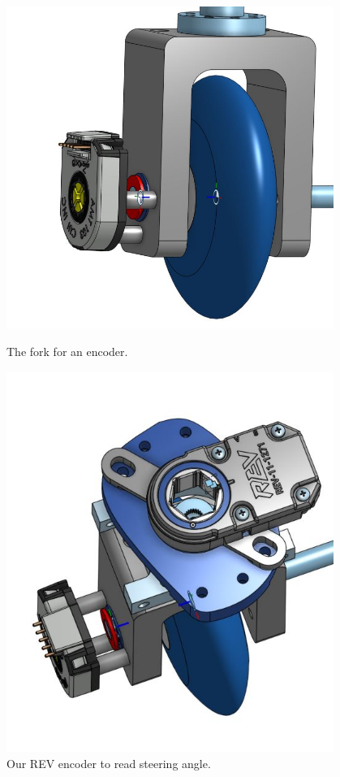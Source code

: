  

\begin{figure}[ht]
\centering
\begin{minipage}[b]{.48\textwidth}
  \centering
  \includegraphics[width=0.95\textwidth]{Meetings/October/10-20-21/10-20-21_CAD_Figure1 - Nathan Forrer.JPG}
  \caption{The fork for an encoder.}
  \label{fig:102021_1}
\end{minipage}%
\hfill%
\begin{minipage}[b]{.48\textwidth}
  \centering
  \includegraphics[width=0.95\textwidth]{Meetings/October/10-20-21/10-20-21_CAD_Figure2 - Nathan Forrer.JPG}
  \caption{Our REV encoder to read steering angle.}
  \label{fig:102021_2}
\end{minipage}
\end{figure}

